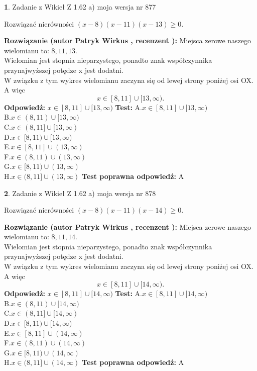 \documentclass[12pt, a4paper]{article}
\theoremstyle{definition} %
\newtheorem{zad}{}
\newcommand{\zadStart}[1]{\begin{zad}#1\newline}
\newcommand{\zadStop}{\end{zad}}
\newcommand{\rozwStart}[2]{\noindent \textbf{Rozwiązanie (autor #1 , recenzent #2): }\newline}
\newcommand{\rozwStop}{\newline}
\newcommand{\odpStart}{\noindent \textbf{Odpowiedź:}\newline}
\newcommand{\odpStop}{\newline}
\newcommand{\testStart}{\noindent \textbf{Test:}\newline}
\newcommand{\testStop}{\newline}
\newcommand{\kluczStart}{\noindent \textbf{Test poprawna odpowiedź:}\newline}
\newcommand{\kluczStop}{\newline}
\begin{document}
\zadStart{Zadanie z Wikieł Z 1.62 a) moja wersja nr 877}

Rozwiązać nierówności $(x-8)(x-11)(x-13)\ge0$.
\zadStop
\rozwStart{Patryk Wirkus}{}
Miejsca zerowe naszego wielomianu to: $8, 11, 13$.\\
Wielomian jest stopnia nieparzystego, ponadto znak współczynnika przy\linebreak najwyższej potędze x jest dodatni.\\ W związku z tym wykres wielomianu zaczyna się od lewej strony poniżej osi OX. A więc $$x \in [8,11] \cup [13,\infty).$$
\rozwStop
\odpStart
$x \in [8,11] \cup [13,\infty)$
\odpStop
\testStart
A.$x \in [8,11] \cup [13,\infty)$\\
B.$x \in (8,11) \cup [13,\infty)$\\
C.$x \in (8,11] \cup [13,\infty)$\\
D.$x \in [8,11) \cup [13,\infty)$\\
E.$x \in [8,11] \cup (13,\infty)$\\
F.$x \in (8,11) \cup (13,\infty)$\\
G.$x \in [8,11) \cup (13,\infty)$\\
H.$x \in (8,11] \cup (13,\infty)$
\testStop
\kluczStart
A
\kluczStop



\zadStart{Zadanie z Wikieł Z 1.62 a) moja wersja nr 878}

Rozwiązać nierówności $(x-8)(x-11)(x-14)\ge0$.
\zadStop
\rozwStart{Patryk Wirkus}{}
Miejsca zerowe naszego wielomianu to: $8, 11, 14$.\\
Wielomian jest stopnia nieparzystego, ponadto znak współczynnika przy\linebreak najwyższej potędze x jest dodatni.\\ W związku z tym wykres wielomianu zaczyna się od lewej strony poniżej osi OX. A więc $$x \in [8,11] \cup [14,\infty).$$
\rozwStop
\odpStart
$x \in [8,11] \cup [14,\infty)$
\odpStop
\testStart
A.$x \in [8,11] \cup [14,\infty)$\\
B.$x \in (8,11) \cup [14,\infty)$\\
C.$x \in (8,11] \cup [14,\infty)$\\
D.$x \in [8,11) \cup [14,\infty)$\\
E.$x \in [8,11] \cup (14,\infty)$\\
F.$x \in (8,11) \cup (14,\infty)$\\
G.$x \in [8,11) \cup (14,\infty)$\\
H.$x \in (8,11] \cup (14,\infty)$
\testStop
\kluczStart
A
\kluczStop
\end{document}
